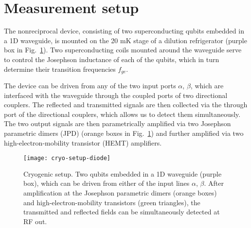 \documentclass[pra, twocolumn, amsmath, amssymb, notitlepage, longbibliography, showpacs, superscriptaddress]{revtex4-1}
\begin{document}



\clearpage

\appendix

\section{Measurement setup}

The nonreciprocal device, consisting of two superconducting qubits embedded 
in a 1D waveguide, is mounted on the 20 mK stage of a dilution refrigerator (purple
box in Fig.~\ref{FigCryoSetup}). Two superconducting coils mounted 
around the waveguide serve to control the Josephson inductance of each
of the qubits, which in turn determine their transition
frequencies $f_{ge}$.

The device can be driven 
from any of the two input ports $\alpha$, $\beta$, which
are interfaced with the waveguide through the coupled ports
of two directional couplers. The reflected
and transmitted signals are then collected via the through
port of the directional couplers, which allows us to detect them 
simultaneously. The two output signals are then parametrically amplified via
two Josephson parametric dimers (JPD) \cite{Eichler2014}
(orange boxes in Fig.~\ref{FigCryoSetup})
and further amplified via two high-electron-mobility transistor (HEMT)
amplifiers. 


\begin{figure}[b]
	\centering
  \texttt{[image: cryo-setup-diode]}
   \caption{Cryogenic setup. Two qubits embedded in a 1D waveguide (purple box),
   which can be driven from either of the input lines $\alpha$, $\beta$. 
   After amplification at the Josephson parametric dimers  (orange boxes)
   and high-electron-mobility transistors (green triangles),
   the transmitted and reflected fields can be simultaneously detected at RF out.
    }
	\label{FigCryoSetup}
\end{figure}
\end{document}
